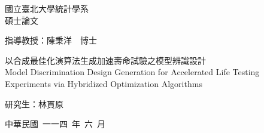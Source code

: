   
\usepackage{wallpaper}                               
\usepackage{changepage}


\fontsize{12}{22pt}\selectfont
\begin{center}
    \huge 國立臺北大學統計學系 \\ 碩士論文
\end{center}
\vspace*{2cm}
\begin{center}
    \LARGE 指導教授：陳秉洋~~博士 \\
\end{center}
\vspace*{2cm}
\begin{center}
    \LARGE 以合成最佳化演算法生成加速壽命試驗之模型辨識設計 \\
    \vspace*{1cm}
    Model Discrimination Design Generation for Accelerated Life Testing Experiments via Hybridized Optimization Algorithms
\end{center}
\vspace*{3cm}
\begin{center}
    \LARGE 研究生：林貫原
\end{center} 
\vspace*{3cm}
\begin{center}
    \LARGE 中華民國~一一四~年~六~月
\end{center}


\newpage
%   
\thispagestyle{empty}


   	

\newpage
\fontsize{12}{22pt}\selectfont 	
\fancyfoot[C]{\thepage}

\cleardoublepage
\setcounter{tocdepth}{2} 

\tableofcontents
\newpage
\listoffigures 
\newpage
\listoftables 
\newpage

\ifodd{} \else \thispagestyle{empty}\mbox{}\clearpage\fi 
{} 		
\setcounter{page}{1} 






\nocite{*}               

